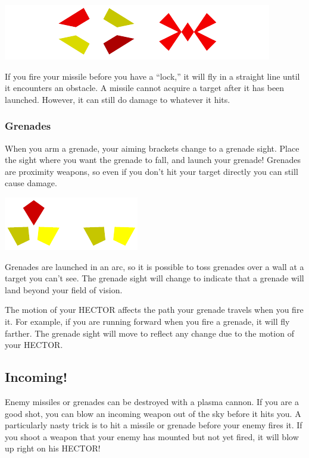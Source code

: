 \documentclass{article}
\begin{document}
\begin{center}
	\includegraphics{img/25.pdf}\\
\end{center}

If you fire your missile before you have a ``lock,'' it will fly in a straight line until it encounters an obstacle. A missile cannot acquire a target after it has been launched. However, it can still do damage to whatever it hits.

\subsubsection{Grenades}
When you arm a grenade, your aiming brackets change to a grenade sight. Place the sight where you want the grenade to fall, and launch your grenade! Grenades are proximity weapons, so even if you don't hit your target directly you can still cause damage.

\begin{center}
	\includegraphics{img/26.pdf}\\
\end{center}

Grenades are launched in an arc, so it is possible to toss grenades over a wall at a target you can't see. The grenade sight will change to indicate that a grenade will land beyond your field of vision.

The motion of your HECTOR affects the path your grenade travels when you fire it. For example, if you are running forward when you fire a grenade, it will fly farther. The grenade sight will move to reflect any change due to the motion of your HECTOR.

\subsection{Incoming!}
Enemy missiles or grenades can be destroyed with a plasma cannon. If you are a good shot, you can blow an incoming weapon out of the sky before it hits you. A particularly nasty trick is to hit a missile or grenade before your enemy fires it. If you shoot a weapon that your enemy has mounted but not yet fired, it will blow up right on his HECTOR!
\end{document}
